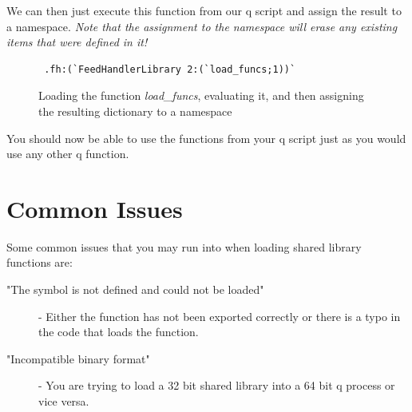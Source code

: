  We can then just execute this function from our q script and assign the result to a namespace. \textit{Note that the assignment to the namespace will erase any existing items that were defined in it!}
 
 \begin{figure}[h]
 \begin{lstlisting}
 .fh:(`FeedHandlerLibrary 2:(`load_funcs;1))`
 \end{lstlisting}
 \caption{Loading the function \textit{load\_funcs}, evaluating it, and then assigning the resulting dictionary to a namespace}
 \end{figure}
 
 You should now be able to use the functions from your q script just as you would use any other q function. 
 
 \section{Common Issues}
 
 Some common issues that you may run into when loading shared library functions are:
 
 \begin{description}
 	\item["The symbol is not defined and could not be loaded"] - Either the function has not been exported correctly or there is a typo in the code that loads the function.
 	
 	\item["Incompatible binary format"] - You are trying to load a 32 bit shared library into a 64 bit q process or vice versa.
 \end{description}